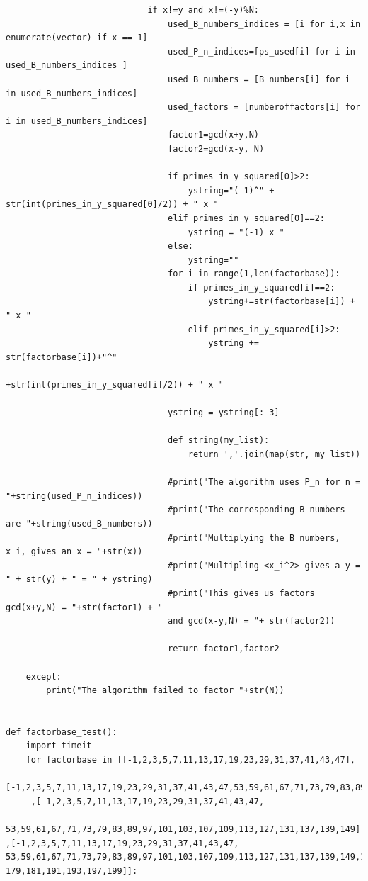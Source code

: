 \documentclass[10pt,a4paper]{report}
\begin{document}
\begin{verbatim}
                            if x!=y and x!=(-y)%N:
                                used_B_numbers_indices = [i for i,x in enumerate(vector) if x == 1]
                                used_P_n_indices=[ps_used[i] for i in used_B_numbers_indices ]
                                used_B_numbers = [B_numbers[i] for i in used_B_numbers_indices]
                                used_factors = [numberoffactors[i] for i in used_B_numbers_indices]
                                factor1=gcd(x+y,N)
                                factor2=gcd(x-y, N)

                                if primes_in_y_squared[0]>2:
                                    ystring="(-1)^" + str(int(primes_in_y_squared[0]/2)) + " x "
                                elif primes_in_y_squared[0]==2:
                                    ystring = "(-1) x "
                                else:
                                    ystring=""
                                for i in range(1,len(factorbase)):
                                    if primes_in_y_squared[i]==2:
                                        ystring+=str(factorbase[i]) + " x "
                                    elif primes_in_y_squared[i]>2:
                                        ystring += str(factorbase[i])+"^"
                                        +str(int(primes_in_y_squared[i]/2)) + " x "

                                ystring = ystring[:-3]

                                def string(my_list):
                                    return ','.join(map(str, my_list))

                                #print("The algorithm uses P_n for n = "+string(used_P_n_indices))
                                #print("The corresponding B numbers are "+string(used_B_numbers))
                                #print("Multiplying the B numbers, x_i, gives an x = "+str(x))
                                #print("Multipling <x_i^2> gives a y = " + str(y) + " = " + ystring)
                                #print("This gives us factors gcd(x+y,N) = "+str(factor1) + " 
                                and gcd(x-y,N) = "+ str(factor2))

                                return factor1,factor2

    except:
        print("The algorithm failed to factor "+str(N))


def factorbase_test():
    import timeit
    for factorbase in [[-1,2,3,5,7,11,13,17,19,23,29,31,37,41,43,47],
     [-1,2,3,5,7,11,13,17,19,23,29,31,37,41,43,47,53,59,61,67,71,73,79,83,89,97]
     ,[-1,2,3,5,7,11,13,17,19,23,29,31,37,41,43,47,
     53,59,61,67,71,73,79,83,89,97,101,103,107,109,113,127,131,137,139,149]
,[-1,2,3,5,7,11,13,17,19,23,29,31,37,41,43,47,
53,59,61,67,71,73,79,83,89,97,101,103,107,109,113,127,131,137,139,149,151,157,163,167,173,
179,181,191,193,197,199]]:


\end{verbatim}
\end{document}
